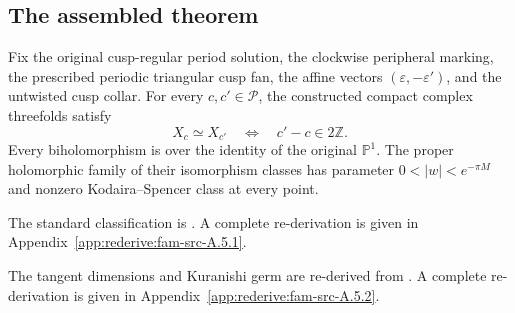 \subsection{The assembled theorem}\hypertarget{tag-01PE}{}\label{fam:section:A.5}

\begin{theorem}\hypertarget{tag-01Q6}{}\label{fam:src:A.5.1}\label{fam:st:A.5.1}\label{wb:pshift:thm:classification}

Fix the original cusp-regular period solution, the clockwise peripheral marking, the prescribed periodic triangular cusp fan, the affine vectors $(\varepsilon,-\varepsilon')$, and the untwisted cusp collar. For every $c,c'\in\mathcal P$, the constructed compact complex threefolds satisfy
\[
 X_c\simeq X_{c'}\quad\Longleftrightarrow\quad c'-c\in2\mathbb Z.
\]
Every biholomorphism is over the identity of the original $\mathbb P^1$. The proper holomorphic family of their isomorphism classes has parameter $0<|w|<e^{-\pi M}$ and nonzero Kodaira--Spencer class at every point.
\end{theorem}



The standard classification is \citet[Theorem~1.4, p.~3]{DuEtAl2026v1}. A complete re-derivation is given in Appendix~\ref{app:rederive:fam-src-A.5.1}.






The tangent dimensions and Kuranishi germ are re-derived from \citet[Theorem~6.12, pp.~81--82, and Proposition~6.16, p.~85]{DuEtAl2026v1}. A complete re-derivation is given in Appendix~\ref{app:rederive:fam-src-A.5.2}.


